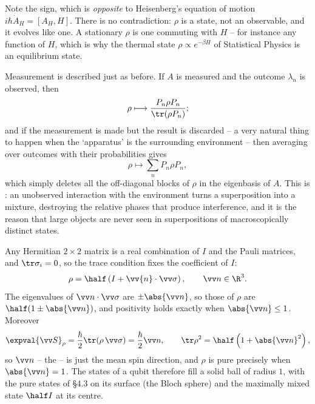 Note the sign, which is \emph{opposite} to Heisenberg's equation of motion $i\hbar \dot A_H = [A_H, H]$. There is no contradiction: $\rho$ is a state, not an observable, and it evolves like one. A stationary $\rho$ is one commuting with $H$ -- for instance any function of $H$, which is why the thermal state $\rho \propto e^{-\beta H}$ of Statistical Physics is an equilibrium state.

Measurement is described just as before. If $A$ is measured and the outcome $\lambda_n$ is observed, then
$$
\rho \longmapsto \frac{P_n \rho P_n}{\tr(\rho P_n)};
$$
and if the measurement is made but the result is discarded -- a very natural thing to happen when the `apparatus' is the surrounding environment -- then averaging over outcomes with their probabilities gives
$$
\rho \longmapsto \sum_n P_n \rho P_n,
$$
which simply deletes all the off-diagonal blocks of $\rho$ in the eigenbasis of $A$. This is : an unobserved interaction with the environment turns a superposition into a mixture, destroying the relative phases that produce interference, and it is the reason that large objects are never seen in superpositions of macroscopically distinct states.

\begin{example}
    Any Hermitian $2\times2$ matrix is a real combination of $I$ and the Pauli matrices, and $\tr\sigma_i = 0$, so the trace condition fixes the coefficient of $I$:
    $$
    \rho = \half\left( I + \vv{n}\cdot\vv\sigma \right), \qquad \vv n \in \R^3.
    $$
    The eigenvalues of $\vv n \cdot \vv\sigma$ are $\pm\abs{\vv n}$, so those of $\rho$ are $\half(1\pm\abs{\vv n})$, and positivity holds exactly when $\abs{\vv n}\leq1$. Moreover
    $$
    \expval{\vv S}_\rho = \frac{\hbar}{2}\tr(\rho\,\vv\sigma) = \frac{\hbar}{2}\vv n, \qquad \tr\rho^2 = \half\left(1 + \abs{\vv n}^2\right),
    $$
    so $\vv n$ -- the  -- is just the mean spin direction, and $\rho$ is pure precisely when $\abs{\vv n} = 1$. The states of a qubit therefore fill a solid ball of radius $1$, with the pure states of \S4.3 on its surface (the Bloch sphere) and the maximally mixed state $\half I$ at its centre.
\end{example}

